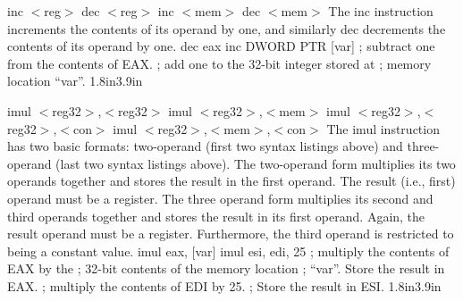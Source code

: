 {inc $<$reg$>$ \hspace{0.5in} dec $<$reg$>$\newline
inc $<$mem$>$ \hspace{0.5in} dec $<$mem$>$}
{The inc instruction increments the contents of its operand by one,
  and similarly dec decrements the contents of its operand by one.}
{dec eax \newline inc DWORD PTR [var]}
{; subtract one from the contents of EAX. \newline
; add one to the 32-bit integer stored at \newline
; memory location ``var''.}
{1.8in}{3.9in}

{imul $<$reg32$>$,$<$reg32$>$\newline
imul $<$reg32$>$,$<$mem$>$\newline
imul $<$reg32$>$,$<$reg32$>$,$<$con$>$\newline
imul $<$reg32$>$,$<$mem$>$,$<$con$>$}
{The imul instruction has two basic formats: two-operand (first two
syntax listings above) and three-operand (last two syntax listings
above).  The two-operand form multiplies its two operands together and
stores the result in the first operand. The result (i.e., first)
operand must be a register.  The three operand form multiplies its
second and third operands together and stores the result in its first
operand. Again, the result operand must be a register.  Furthermore,
the third operand is restricted to being a constant value.}
{imul eax, [var]\newline\newline\newline
imul esi, edi, 25}
{; multiply the contents of EAX by the \newline
; 32-bit contents of the memory location \newline
; ``var''. Store the result in EAX.\newline
; multiply the contents of EDI by 25. \newline
; Store the result in ESI.}
{1.8in}{3.9in}

